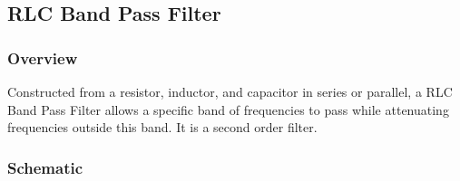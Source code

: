 \subsection{RLC Band Pass Filter}

\subsubsection{Overview}
Constructed from a resistor, inductor, and capacitor in series
or parallel, a RLC Band Pass Filter allows a specific band of
frequencies to pass while attenuating frequencies outside this
band. It is a second order filter.

\subsubsection{Schematic}

